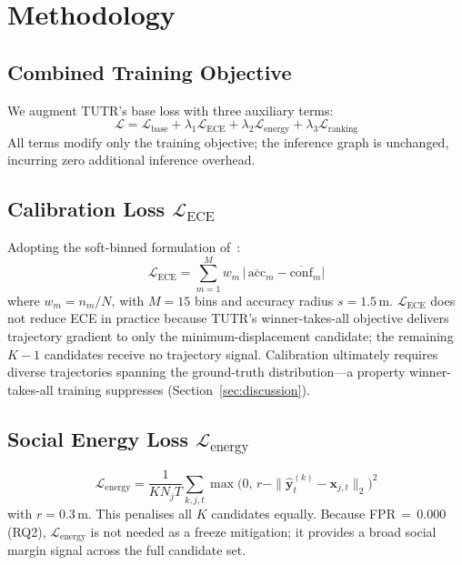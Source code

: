 \documentclass[journal,letterpaper]{IEEEtran}
\begin{document}
\section{Methodology}
\label{sec:method}

\subsection{Combined Training Objective}

We augment TUTR's base loss with three auxiliary terms:
\begin{equation}
  \mathcal{L} = \mathcal{L}_{\text{base}} +
                \lambda_1\mathcal{L}_{\text{ECE}} +
                \lambda_2\mathcal{L}_{\text{energy}} +
                \lambda_3\mathcal{L}_{\text{ranking}}
  \label{eq:combined}
\end{equation}
All terms modify only the training objective; the inference graph is
unchanged, incurring zero additional inference overhead.

\subsection{Calibration Loss \texorpdfstring{$\mathcal{L}_{\text{ECE}}$}{L\_ECE}}

Adopting the soft-binned formulation of~\cite{karandikar2021soft}:
\begin{equation}
  \mathcal{L}_{\text{ECE}} = \sum_{m=1}^{M} w_m\,
  \bigl|\,\overline{\mathrm{acc}}_m - \overline{\mathrm{conf}}_m\bigr|
  \label{eq:lece}
\end{equation}
where $w_m=n_m/N$, with $M{=}15$ bins and accuracy radius
$s{=}1.5$\,m.
$\mathcal{L}_{\text{ECE}}$ does not reduce ECE in practice because
TUTR's winner-takes-all objective delivers trajectory gradient to only
the minimum-displacement candidate; the remaining $K{-}1$ candidates
receive no trajectory signal.
Calibration ultimately requires diverse trajectories spanning the
ground-truth distribution---a property winner-takes-all training
suppresses (Section~\ref{sec:discussion}).

\subsection{Social Energy Loss \texorpdfstring{$\mathcal{L}_{\text{energy}}$}{L\_energy}}

\begin{equation}
  \mathcal{L}_{\text{energy}} = \frac{1}{KN_jT}
  \sum_{k,j,t}\max\!\bigl(0,\,r-\|\hat{\mathbf{y}}^{(k)}_t
  -\mathbf{x}_{j,t}\|_2\bigr)^2
  \label{eq:lenergy}
\end{equation}
with $r{=}0.3$\,m. This penalises all $K$ candidates equally.
Because FPR\,\(=\,0.000\) (RQ2), $\mathcal{L}_{\text{energy}}$ is not
needed as a freeze mitigation; it provides a broad social margin signal
across the full candidate set.
\end{document}
